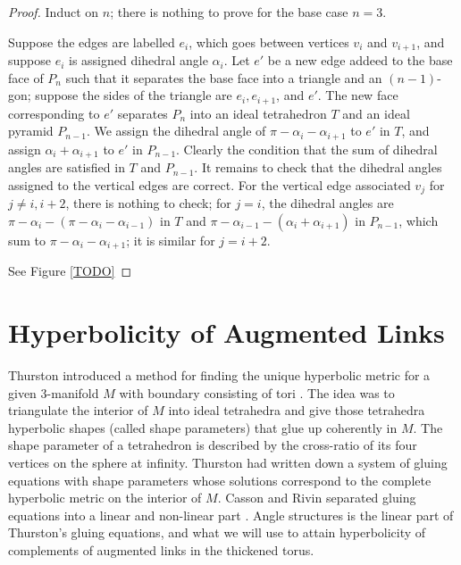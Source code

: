 \documentclass[11pt]{amsart}
\theoremstyle{plain}
\theoremstyle{definition}
\begin{document}
\begin{proof}
Induct on $n$; there is nothing to prove for the base case $n=3$.

Suppose the edges are labelled $e_i$,
which goes between vertices $v_i$ and $v_{i+1}$,
and suppose $e_i$ is assigned dihedral angle $\alpha_i$.
Let $e'$ be a new edge addeed to the base face of $P_n$
such that it separates the base face into a triangle and
an $(n-1)$-gon;
suppose the sides of the triangle are
$e_i, e_{i+1}$, and $e'$.
The new face corresponding to $e'$ separates $P_n$ into
an ideal tetrahedron $T$ and an ideal pyramid $P_{n-1}$.
We assign the dihedral angle of $\pi - \alpha_i - \alpha_{i+1}$
to $e'$ in $T$, and assign $\alpha_i + \alpha_{i+1}$ to $e'$ in $P_{n-1}$.
Clearly the condition that the sum of dihedral angles are satisfied
in $T$ and $P_{n-1}$.
It remains to check that the dihedral angles assigned to the vertical edges
are correct.
For the vertical edge associated $v_j$ for $j \neq i, i+2$,
there is nothing to check;
for $j = i$, the dihedral angles are
$\pi - \alpha_i - (\pi - \alpha_i - \alpha_{i-1})$
in $T$ and $\pi - \alpha_{i-1} - (\alpha_i + \alpha_{i+1})$ in $P_{n-1}$,
which sum to $\pi - \alpha_i - \alpha_{i+1}$;
it is similar for $j = i+2$.

See Figure \ref{TODO}
\end{proof}




\section{Hyperbolicity of Augmented Links}
Thurston introduced a method for finding the unique hyperbolic metric for a given 3-manifold $M$ with boundary consisting of tori \cite{Thurston}. The idea was to triangulate the interior of $M$ into ideal tetrahedra and give those tetrahedra hyperbolic shapes (called shape parameters) that glue up coherently in $M$. The shape parameter of a tetrahedron is described by the cross-ratio of its four vertices on the sphere at infinity. Thurston had written down a system of gluing equations with shape parameters whose solutions correspond to the complete hyperbolic metric on the interior of $M$. Casson and Rivin separated gluing equations into a linear and non-linear part \cite{Casson-Rivin}. Angle structures is the linear part of Thurston's gluing equations, and what we will use to attain hyperbolicity of complements of augmented links in the thickened torus. 
\end{document}

